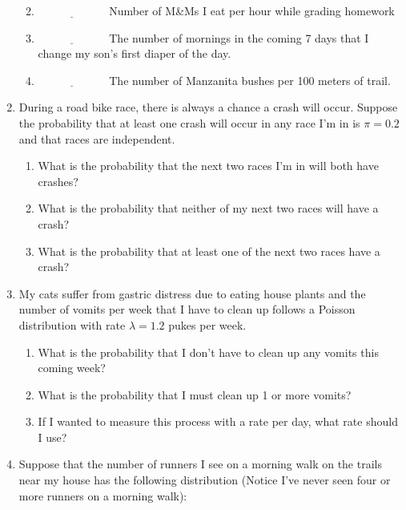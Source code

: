 \documentclass[]{book}
\providecommand{\tightlist}{%
  \setlength{\itemsep}{0pt}\setlength{\parskip}{0pt}}
\begin{document}
\begin{enumerate}
  \begin{enumerate}
  \def\labelenumii{\alph{enumii})}
  \tightlist
  \item
    \(\underline{\hspace{1in}}\) Number of M\&Ms I eat per hour while
    grading homework
  \item
    \(\underline{\hspace{1in}}\) The number of mornings in the coming 7
    days that I change my son's first diaper of the day.
  \item
    \(\underline{\hspace{1in}}\) The number of Manzanita bushes per 100
    meters of trail.
  \end{enumerate}
\item
  During a road bike race, there is always a chance a crash will occur.
  Suppose the probability that at least one crash will occur in any race
  I'm in is \(\pi=0.2\) and that races are independent.

  \begin{enumerate}
  \def\labelenumii{\alph{enumii})}
  \tightlist
  \item
    What is the probability that the next two races I'm in will both
    have crashes?
  \item
    What is the probability that neither of my next two races will have
    a crash?
  \item
    What is the probability that at least one of the next two races have
    a crash?
  \end{enumerate}
\item
  My cats suffer from gastric distress due to eating house plants and
  the number of vomits per week that I have to clean up follows a
  Poisson distribution with rate \(\lambda=1.2\) pukes per week.

  \begin{enumerate}
  \def\labelenumii{\alph{enumii})}
  \tightlist
  \item
    What is the probability that I don't have to clean up any vomits
    this coming week?
  \item
    What is the probability that I must clean up 1 or more vomits?
  \item
    If I wanted to measure this process with a rate per day, what rate
    should I use?
  \end{enumerate}
\item
  Suppose that the number of runners I see on a morning walk on the
  trails near my house has the following distribution (Notice I've never
  seen four or more runners on a morning walk):


\end{enumerate}
\end{document}
